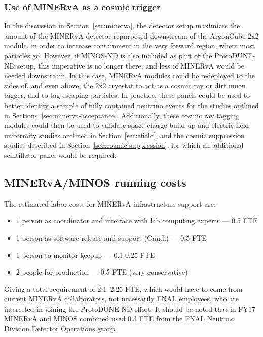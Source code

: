 \subsubsection{Use of MINERvA as a cosmic trigger}
In the discussion in Section~\ref{sec:minerva}, the detector setup maximizes the amount of the MINERvA detector repurposed downstream of the ArgonCube 2x2 module, in order to increase containment in the very forward region, where most particles go. However, if MINOS-ND is also included as part of the ProtoDUNE-ND setup, this imperative is no longer there, and less of MINERvA would be needed downstream. In this case, MINERvA modules could be redeployed to the sides of, and even above, the 2x2 cryostat to act as a cosmic ray or dirt muon tagger, and to tag escaping particles. In practice, these panels could be used to better identify a sample of fully contained neutrino events for the studies outlined in Sections~\ref{sec:minerva-acceptance}. Additionally, these cosmic ray tagging modules could then be used to validate space charge build-up and electric field uniformity studies outlined in Section~\ref{sec:efield}, and the cosmic suppression studies described in Section~\ref{sec:cosmic-suppression}, for which an additional scintillator panel would be required.

\subsection{MINERvA/MINOS running costs}
The estimated labor costs for MINERvA infrastructure support are:
\begin{itemize}
\item 1 person as coordinator and interface with lab computing experts --- 0.5 FTE
\item 1 person as software release and support (Gaudi) --- 0.5 FTE
\item 1 person to monitor keepup --- 0.1-0.25 FTE
\item 2 people for production --- 0.5 FTE (very conservative)
\end{itemize}
Giving a total requirement of 2.1--2.25 FTE, which would have to come from current MINERvA collaborators, not necessarily FNAL employees, who are interested in joining the ProtoDUNE-ND effort. It should be noted that in FY17 MINERvA and MINOS combined used 0.3 FTE from the FNAL Neutrino Division Detector Operations group.

